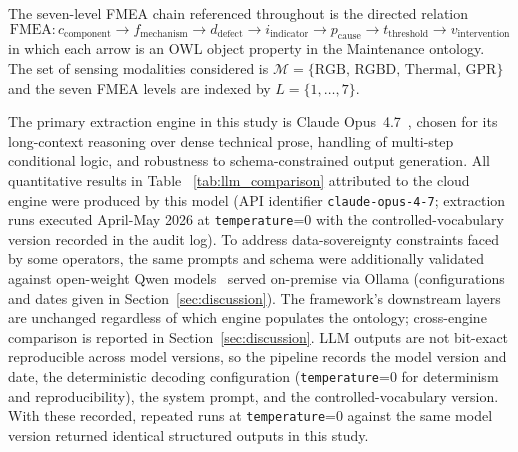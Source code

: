 \documentclass[11pt,a4paper]{article}
\begin{document}
The seven-level FMEA chain referenced throughout is the directed relation
\begin{equation}
  \mathrm{FMEA} : c_{\text{component}} \to f_{\text{mechanism}}
  \to d_{\text{defect}} \to i_{\text{indicator}}
  \to p_{\text{cause}} \to t_{\text{threshold}}
  \to v_{\text{intervention}}
  \label{eq:fmea_chain}
\end{equation}
in which each arrow is an OWL object property in the Maintenance ontology. The set of sensing modalities considered is $\mathcal{M}=\{\text{RGB, RGBD, Thermal, GPR}\}$ and the seven FMEA
levels are indexed by $L=\{1,\dots,7\}$.

The primary extraction engine in this study is Claude Opus~4.7~\citep{Anthropic2025}, chosen for its long-context reasoning over dense technical prose, handling of multi-step conditional logic, and robustness to schema-constrained output
generation. All quantitative results in Table ~\ref{tab:llm_comparison} attributed to the cloud engine were produced by this model (API identifier \texttt{claude-opus-4-7}; extraction runs executed April-May 2026 at \texttt{temperature}=0 with the controlled-vocabulary version recorded in the audit log). To address data-sovereignty constraints faced by some operators, the same prompts and schema were additionally validated against open-weight Qwen models~\citep{Qwen2024} served on-premise via Ollama (configurations and dates given in Section~\ref{sec:discussion}). The framework's downstream layers are unchanged regardless of which engine populates the ontology; cross-engine comparison is reported in Section~\ref{sec:discussion}. LLM outputs are not bit-exact reproducible across model versions, so the pipeline records the model version and date, the deterministic decoding configuration (\texttt{temperature}=0 for determinism and reproducibility), the system prompt, and the controlled-vocabulary version. With these recorded, repeated runs at \texttt{temperature}=0 against the same model version returned identical structured outputs in this study.
\end{document}
